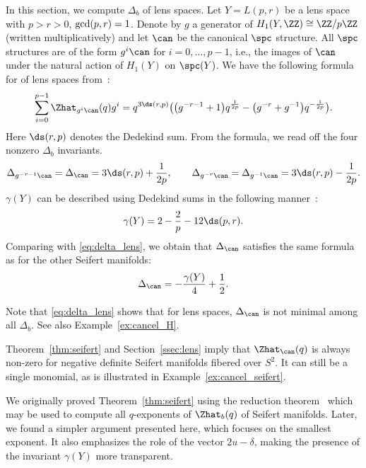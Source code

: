 \documentclass[10pt,a4paper]{amsart}
\newcounter{theorem}
\begin{document}
In this section, we compute $\Delta_b$ of lens spaces. Let $Y= L(p,r) $ be a lens space with $p>r>0$, ${\rm gcd}(p,r)=1$. Denote by $g$ a generator of $H_1(Y,\ZZ) \cong \ZZ/p\ZZ$ (written multiplicatively) and let $\can$ be the canonical $\spc$ structure. All $\spc$ structures are of the form $g^i \can$ for $i=0, \dots, p-1$, i.e., the images of $\can$ under the natural action of $H_1(Y)$ on $\spc(Y)$.
 We have the following formula for  of lens spaces from~\cite[Section~4.2.]{GKS23}:
 \begin{equation*}
 \sum_{i=0}^{p-1} \Zhat_{g^i \can}(q)g^i
 = q^{3\ds(r,p)} \bigl(\bigl(g^{-r-1}+1\bigr) q^{\frac{1}{2p}} - \bigl(g^{-r}+g^{-1}\bigr) q^{-\frac{1}{2p}}\bigr).
 \end{equation*}
 Here $\ds(r,p)$ denotes the Dedekind sum. From the formula, we read off the four nonzero $\Delta_b$ invariants.
 \begin{equation}\label{eq:delta_lens}
 \Delta_{g^{-r-1}\can} = \Delta_{\can} = 3\ds(r,p) + \frac{1}{2p}, \qquad
 \Delta_{g^{-r}\can} = \Delta_{g^{-1}\can} = 3\ds(r,p) - \frac{1}{2p}.
 \end{equation}
$\gamma(Y)$ can be described using Dedekind sums in the following manner~\cite[p.~304]{NeNi02}:
\[
 \gamma(Y) = 2 - \frac{2}{p} - 12\ds(p,r).
\]
Comparing with \eqref{eq:delta_lens}, we obtain that $\Delta_{\can}$ satisfies the same formula as for the other Seifert manifolds:
\begin{equation*}
 \Delta_{\can} = -\frac{\gamma(Y)}{4} + \frac12.
\end{equation*}

Note that \eqref{eq:delta_lens} shows that for lens spaces, $\Delta_{\can}$ is not minimal among all $\Delta_b$. See also Example~\ref{ex:cancel_H}.


\begin{Remark}
 Theorem~\ref{thm:seifert} and Section~\ref{ssec:lens}
imply that $\Zhat_{\can}(q)$ is always non-zero for negative definite Seifert manifolds fibered over $S^2$. It can still be a single monomial, as is illustrated in Example~\ref{ex:cancel_seifert}.
\end{Remark}


\begin{Remark}
 We originally proved Theorem~\ref{thm:seifert} using the reduction theorem~\cite[Theorem~4.2]{GKS23} which may be used to compute all $q$-exponents of $\Zhat_b(q)$ of Seifert manifolds. Later, we found a simpler argument presented here, which focuses on the smallest exponent. It also emphasizes the role of the vector $2u-\delta$, making the presence of the invariant $\gamma(Y)$ more transparent.
\end{Remark}
\end{document}
